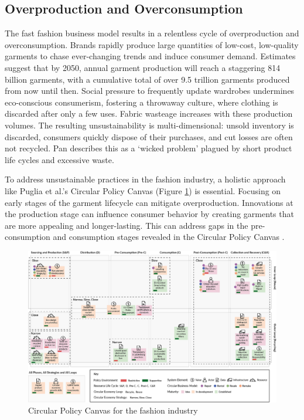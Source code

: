 \subsection{Overproduction and Overconsumption}
The fast fashion business model results in a relentless cycle of overproduction and overconsumption. Brands rapidly produce large quantities of low-cost, low-quality garments to chase ever-changing trends and induce consumer demand. Estimates suggest that by 2050, annual garment production will reach a staggering 814 billion garments, with a cumulative total of over 9.5 trillion garments produced from now until then. Social pressure to frequently update wardrobes undermines eco-conscious consumerism, fostering a throwaway culture, where clothing is discarded after only a few uses. Fabric wasteage increases with these production volumes. The resulting unsustainability is multi-dimensional: unsold inventory is discarded, consumers quickly dispose of their purchases, and cut losses are often not recycled. Pan describes this as a `wicked problem' plagued by short product life cycles and excessive waste.

\vspace{\baselineskip}
To address unsustainable practices in the fashion industry, a holistic approach like Puglia et al.'s Circular Policy Canvas (Figure \ref{fig:circular_policy_canvas}) is essential. Focusing on early stages of the garment lifecycle can mitigate overproduction. Innovations at the production stage can influence consumer behavior by creating garments that are more appealing and longer-lasting. This can address gaps in the pre-consumption and consumption stages revealed in the Circular Policy Canvas \cite{puglia_circular_2024}.
\begin{figure} [H]
    \centering
    \includegraphics[width=\textwidth]{Images/circular policy canvas.png}
    \caption{Circular Policy Canvas for the fashion industry \cite{puglia_circular_2024}}
    \label{fig:circular_policy_canvas}
\end{figure}

